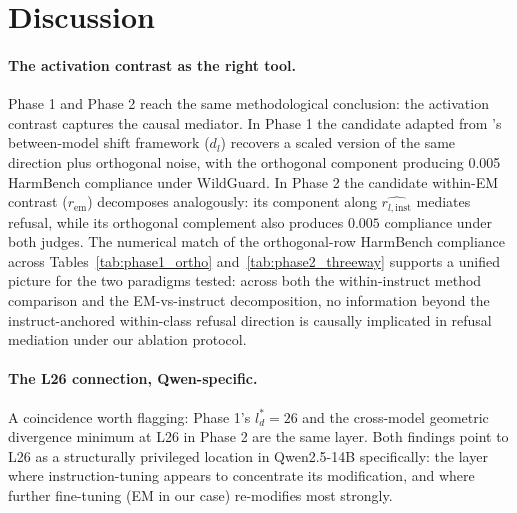 \documentclass{article}
\newcommand{\rinst}{r_{l,\mathrm{inst}}}
\newcommand{\rem}{r_{\mathrm{em}}}
\begin{document}
\section{Discussion}
\label{sec:discussion}

\paragraph{The activation contrast as the right tool.} Phase 1 and
Phase 2 reach the same methodological conclusion: the activation
contrast captures the causal mediator. In Phase 1 the candidate adapted from \citet{giordani2025reemergent}'s 
between-model shift framework ($d_l$) recovers a scaled version of the 
same direction plus orthogonal noise, with the orthogonal component 
producing 0.005 HarmBench compliance under WildGuard. In Phase 2 the candidate
within-EM contrast ($\rem$) decomposes analogously: its component
along $\hat{\rinst}$ mediates refusal, while its orthogonal
complement also produces $0.005$ compliance under both judges. The
numerical match of the orthogonal-row HarmBench compliance across
Tables~\ref{tab:phase1_ortho} and~\ref{tab:phase2_threeway}
supports a unified picture for the two paradigms tested: across
both the within-instruct method comparison and the EM-vs-instruct
decomposition, no information beyond the instruct-anchored
within-class refusal direction is causally implicated in refusal
mediation under our ablation protocol.

\paragraph{The L26 connection, Qwen-specific.} A coincidence worth
flagging: Phase 1's $l^{*}_d=26$ and the cross-model geometric
divergence minimum at L26 in Phase 2 are the same layer. Both
findings point to L26 as a structurally privileged location in
Qwen2.5-14B specifically: the layer where instruction-tuning
appears to concentrate its modification, and where further
fine-tuning (EM in our case) re-modifies most strongly.
\end{document}

